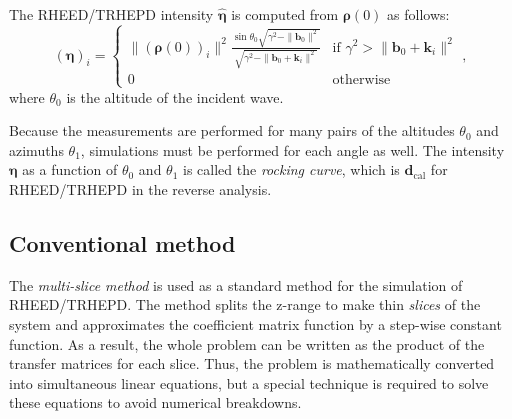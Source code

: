 \documentclass[preprint, 5p, times, sort&compress]{elsarticle}
\def\veck{\bm{k}}
\def\vecb{\bm{b}}
\def\vrho{\bm{\rho}}
\def\veta{\bm{\eta}}
\begin{document}
        The RHEED\slash TRHEPD intensity $\hat{\veta}$ is computed from $\vrho(0)$ as follows:
        \begin{equation}
                (\veta)_i = \begin{cases}
                        \|(\vrho(0))_i\|^2 \frac{\sin\theta_0\sqrt{\gamma^2-\|\vecb_0\|^2}}{\sqrt{\gamma^2-\|\vecb_0+\veck_i\|^2}} &
                        \text{if } \gamma^2 > \|\vecb_0+\veck_i\|^2 \\
                        0 & \text{otherwise}
                \end{cases},
        \end{equation}
        where $\theta_0$ is the altitude of the incident wave.

        Because the measurements are performed for many pairs of the altitudes $\theta_0$ and azimuths $\theta_1$,
        simulations must be performed for each angle as well.
        The intensity $\veta$ as a function of $\theta_0$ and $\theta_1$ is called
        the \emph{rocking curve},
        which is $\bm{d}_\mathrm{cal}$ for RHEED\slash TRHEPD in the reverse analysis.

        \subsection{Conventional method}
        The \emph{multi-slice method} is used as a standard method for the simulation of RHEED\slash TRHEPD.
        The method splits the z-range to make thin \emph{slices} of the system
        and approximates the coefficient matrix function by a step-wise constant function.
        As a result, the whole problem can be written as the product of the transfer matrices for each slice.
        Thus, the problem is mathematically converted into simultaneous linear equations,
        but a special technique is required to solve these equations to avoid numerical breakdowns.
\end{document}
